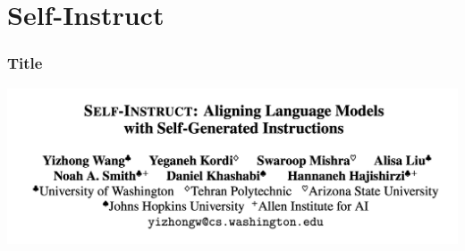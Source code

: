 \documentclass[xcolor=dvipsnames]{beamer}
\newcommand{\0}{\vec{0}}
\begin{document}
%	
%	


\section{Self-Instruct}
\begin{frame}
	\frametitle{Title}
	\begin{center}
		\includegraphics[width=\textwidth]{Wang0}
	\end{center}
\end{frame}
\end{document}
